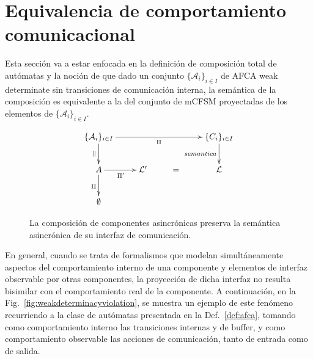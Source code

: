 \chapter{Equivalencia de comportamiento comunicacional}
\label{resultados}
Esta sección va a estar enfocada en la definición de composición total de autómatas y la noción de que dado un conjunto $\{ \mathcal{A}_i\}_{i \in I}$ de AFCA weak determinate sin transiciones de comunicación interna, la semántica de la composición es equivalente a la del conjunto de mCFSM proyectadas de los elementos de $\{ \mathcal{A}_i\}_{i \in I}$. 

\begin{figure}[H]
$$
\xymatrix{   
	\{\mathcal{A}_i\}_{i \in I} \ar[rrr]_{\Pi} \ar[d]_{||} & & & \{C_i\}_{i \in I}  \ar[d]_{semantica}  \\
	  {A} \ar[r]_{\Pi'} \ar[d]_{\Pi} & \mathcal{L}' & = & {\mathcal{L}}  \\
	  \emptyset
}
$$
\caption{La composición de componentes asincrónicas preserva la semántica asincrónica de su interfaz de comunicación.}
\label{fig:preservacion}
\end{figure}

En general, cuando se trata de formalismos que modelan simultáneamente aspectos del comportamiento interno de una componente y elementos de interfaz observable por otras componentes, la proyección de dicha interfaz no resulta bisimilar con el comportamiento real de la componente. A continuación, en la Fig.~\ref{fig:weakdeterminacyviolation}, se muestra un ejemplo de este fenómeno recurriendo a la clase de autómatas presentada en la Def.~\ref{def:afca}, tomando como comportamiento interno las transiciones internas y de buffer, y como comportamiento observable las acciones de comunicación, tanto de entrada como de salida.

